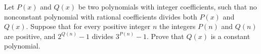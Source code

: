 Let 
$P(x)$
 and 
$Q(x)$
 be two polynomials with integer coefficients, such that no nonconstant polynomial with rational coefficients divides both 
$P(x)$
 and 
$Q(x).$
 Suppose that for every positive integer 
$n$
 the integers 
$P(n)$
 and 
$Q(n)$
 are positive, and 
$2^{Q(n)}-1$
 divides 
$3^{P(n)}-1.$
 Prove that 
$Q(x)$
 is a constant polynomial.
